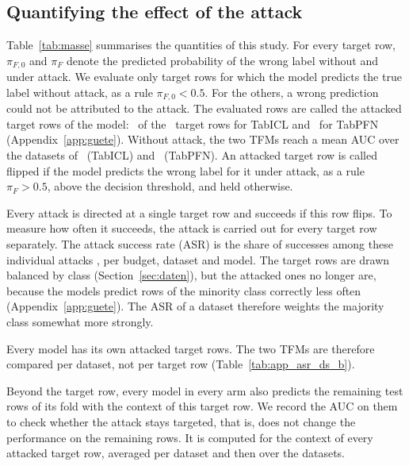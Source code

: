 \documentclass[pdflatex,sn-mathphys-num]{sn-jnl}
\newcommand{\pf}{\pi_F}
\newcommand{\pfnull}{\pi_{F,0}}
\begin{document}
\subsection{Quantifying the effect of the attack}
\label{sec:wirkung}

Table~\ref{tab:masse} summarises the quantities of this study. For every
target row, $\pfnull$ and $\pf$ denote the predicted probability of the
wrong label without and under attack. We evaluate only target rows for which the model predicts the true label
without attack, as a rule $\pfnull < 0.5$. For the others, a wrong
prediction could not be attributed to the attack. The evaluated rows are
called the attacked target rows of the model: \zICLangegriffen\ of the \zZiele\ target rows for TabICL and
\zPFNangegriffen\ for TabPFN (Appendix~\ref{app:guete}). Without attack,
the two TFMs reach a mean AUC over the datasets of \zICLauc\ (TabICL)
and \zPFNauc\ (TabPFN). An attacked target row is called flipped if the
model predicts the wrong label for it under attack, as a rule $\pf > 0.5$, above the decision threshold, and held
otherwise.

Every attack is directed at a single target row and succeeds if this row
flips.
To measure how often it succeeds, the attack is carried out for
every target row separately. The attack success rate (ASR)
is the share of successes among these individual attacks
\citep{shafahi2018}, per budget, dataset and model. The target rows are
drawn balanced by class (Section~\ref{sec:daten}), but the attacked ones
no longer are, because the models predict rows of the minority class
correctly less often (Appendix~\ref{app:guete}). The ASR of a dataset
therefore weights the majority class somewhat more strongly.

Every model has its own attacked target rows. The two TFMs are therefore
compared per dataset, not per target row
(Table~\ref{tab:app_asr_ds_b}).

Beyond the target row, every model in every arm also predicts the
remaining test rows of its fold with the context of this target row. We
record the AUC on them to check whether the attack stays targeted, that
is, does not change the performance on the remaining rows. It is
computed for the context of every attacked target row, averaged per
dataset and then over the datasets.
\end{document}
